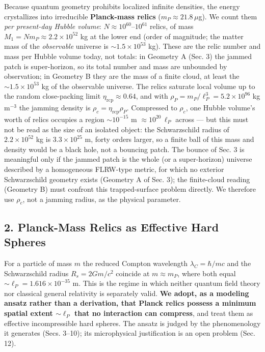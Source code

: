 \documentclass[
]{article}
\begin{document}
Because quantum geometry prohibits localized infinite densities, the
energy crystallizes into irreducible \textbf{Planck-mass relics}
(\(m_P \approx 21.8\,\mu\)g). We count them \emph{per present-day Hubble
volume}: \(N \approx 10^{60}\)--\(10^{61}\) relics, of mass
\(M_1 = N m_P \approx 2.2\times10^{52}\) kg at the lower end (order of
magnitude; the matter mass of the \emph{observable} universe is
\(\sim\!1.5\times10^{53}\) kg). These are the relic number and mass per
Hubble volume today, not totals: in Geometry A (Sec. 3) the jammed patch
is super-horizon, so its total number and mass are unbounded by
observation; in Geometry B they are the mass of a finite cloud, at least
the \(\sim\!1.5\times10^{53}\) kg of the observable universe. The relics
saturate local volume up to the random close-packing limit
\(\eta_{\text{rcp}} \approx 0.64\), and with
\(\rho_P = m_P/\ell_P^3 = 5.2\times10^{96}\) kg m\(^{-3}\) the jamming
density is \(\rho_c = \eta_{\text{rcp}}\rho_P\). Compressed to
\(\rho_c\), one Hubble volume's worth of relics occupies a region
\(\sim\!10^{-15}\) m \(\approx 10^{20}\,\ell_P\) across --- but this
must not be read as the size of an isolated object: the Schwarzschild
radius of \(2.2\times10^{52}\) kg is \(3.3\times10^{25}\) m, forty
orders larger, so a finite ball of this mass and density would be a
black hole, not a bouncing patch. The bounce of Sec. 3 is meaningful
only if the jammed patch is the whole (or a super-horizon) universe
described by a homogeneous FLRW-type metric, for which no exterior
Schwarzschild geometry exists (Geometry A of Sec. 3); the finite-cloud
reading (Geometry B) must confront this trapped-surface problem
directly. We therefore use \(\rho_c\), not a jamming radius, as the
physical parameter.

\hypertarget{planck-mass-relics-as-effective-hard-spheres}{%
\subsection{\texorpdfstring{\textbf{2. Planck-Mass Relics as Effective
Hard
Spheres}}{2. Planck-Mass Relics as Effective Hard Spheres}}\label{planck-mass-relics-as-effective-hard-spheres}}

For a particle of mass \(m\) the reduced Compton wavelength
\(\lambda_C = \hbar/mc\) and the Schwarzschild radius \(R_s = 2Gm/c^2\)
coincide at \(m \approx m_P\), where both equal
\(\sim\!\ell_P = 1.616\times10^{-35}\) m. This is the regime in which
neither quantum field theory nor classical general relativity is
separately valid. \textbf{We adopt, as a modeling ansatz rather than a
derivation, that Planck relics possess a minimum spatial extent
\(\sim\!\ell_P\) that no interaction can compress}, and treat them as
effective incompressible hard spheres. The ansatz is judged by the
phenomenology it generates (Secs. 3--10); its microphysical
justification is an open problem (Sec. 12).
\end{document}
